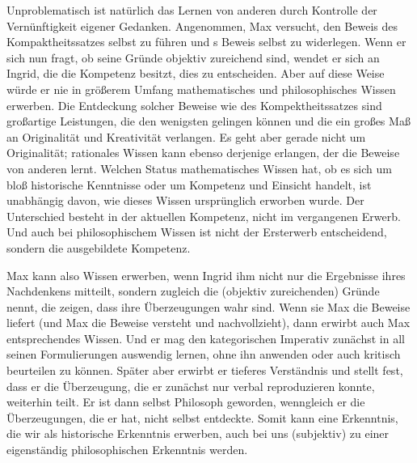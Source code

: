 Unproblematisch ist natürlich das Lernen von anderen durch Kontrolle der
Vernünftigkeit eigener Gedanken. Angenommen, Max versucht, den Beweis des
Kompaktheitssatzes selbst zu führen und
s Beweis
selbst zu widerlegen. Wenn er sich nun fragt, ob seine Gründe objektiv
zureichend sind, wendet er sich an Ingrid, die die Kompetenz besitzt, dies zu
entscheiden. Aber auf diese Weise würde er nie in größerem Umfang mathematisches
und philosophisches Wissen erwerben. Die Entdeckung solcher Beweise wie des
Kompektheitssatzes sind großartige Leistungen, die den wenigsten gelingen
können und die ein großes Maß an Originalität und Kreativität verlangen. Es geht
aber gerade nicht um Originalität; rationales Wissen kann ebenso derjenige
erlangen, der die Beweise von anderen lernt. Welchen Status mathematisches
Wissen hat, ob es sich um bloß historische Kenntnisse oder um Kompetenz und
Einsicht handelt, ist unabhängig davon, wie dieses Wissen ursprünglich erworben
wurde. Der Unterschied besteht in der aktuellen Kompetenz, nicht im vergangenen
Erwerb. Und auch bei philosophischem Wissen ist nicht der Ersterwerb
entscheidend, sondern die ausgebildete Kompetenz.

Max kann also Wissen erwerben, wenn Ingrid ihm nicht nur die Ergebnisse ihres
Nachdenkens mitteilt, sondern zugleich die (objektiv zureichenden) Gründe nennt,
die zeigen, dass ihre Überzeugungen wahr sind. Wenn sie Max die Beweise liefert
(und Max die Beweise versteht und nachvollzieht), dann erwirbt auch Max
entsprechendes Wissen. Und er mag den kategorischen Imperativ zunächst in
all seinen Formulierungen auswendig lernen, ohne ihn anwenden oder auch kritisch beurteilen
zu können. Später aber erwirbt er tieferes Verständnis und stellt fest, dass er
die Überzeugung, die er zunächst nur verbal reproduzieren konnte, weiterhin
teilt. Er ist dann selbst Philosoph geworden, wenngleich er die Überzeugungen,
die er hat, nicht selbst entdeckte. Somit kann eine Erkenntnis, die wir als
historische Erkenntnis erwerben, auch bei uns (subjektiv) zu einer eigenständig
philosophischen Erkenntnis werden.

